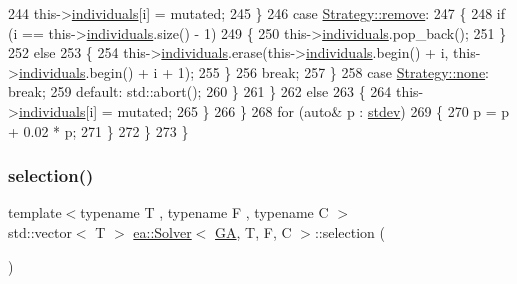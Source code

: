 \begin{DoxyCode}
244                         this->\hyperlink{classea_1_1_solver__base_ad75bc440d24a46e97694c7c889f2ecde}{individuals}[i] = mutated;
245                     \}
246                     \textcolor{keywordflow}{case} \hyperlink{namespaceea_a8e369877773b4db67b8512efdb4f8f89a0f6969d7052da9261e31ddb6e88c136e}{Strategy::remove}:
247                     \{
248                         \textcolor{keywordflow}{if} (i == this->\hyperlink{classea_1_1_solver__base_ad75bc440d24a46e97694c7c889f2ecde}{individuals}.size() - 1)
249                         \{
250                             this->\hyperlink{classea_1_1_solver__base_ad75bc440d24a46e97694c7c889f2ecde}{individuals}.pop\_back();
251                         \}
252                         \textcolor{keywordflow}{else}
253                         \{
254                             this->\hyperlink{classea_1_1_solver__base_ad75bc440d24a46e97694c7c889f2ecde}{individuals}.erase(this->\hyperlink{classea_1_1_solver__base_ad75bc440d24a46e97694c7c889f2ecde}{individuals}.begin() + i, 
      this->\hyperlink{classea_1_1_solver__base_ad75bc440d24a46e97694c7c889f2ecde}{individuals}.begin() + i + 1);
255                         \}
256                         \textcolor{keywordflow}{break};
257                     \}
258                     \textcolor{keywordflow}{case} \hyperlink{namespaceea_a8e369877773b4db67b8512efdb4f8f89a334c4a4c42fdb79d7ebc3e73b517e6f8}{Strategy::none}: \textcolor{keywordflow}{break};
259                     \textcolor{keywordflow}{default}: std::abort();
260                     \}
261                 \}
262                 \textcolor{keywordflow}{else}
263                 \{
264                     this->\hyperlink{classea_1_1_solver__base_ad75bc440d24a46e97694c7c889f2ecde}{individuals}[i] = mutated;
265                 \}
266             \}
268             \textcolor{keywordflow}{for} (\textcolor{keyword}{auto}& p : \hyperlink{classea_1_1_solver_3_01_g_a_00_01_t_00_01_f_00_01_c_01_4_a097a7ec4bbcf9e5bade6e498d55d4d11}{stdev})
269             \{
270                 p = p + 0.02 * p;
271             \}
272         \}
273     \}
\end{DoxyCode}
\mbox{\label{classea_1_1_solver_3_01_g_a_00_01_t_00_01_f_00_01_c_01_4_a1bc73c28211d7ba80665b286fbdea948}} 
\subsubsection{\texorpdfstring{selection()}{selection()}}
{\footnotesize\ttfamily template$<$typename T , typename F , typename C $>$ \\
std\+::vector$<$ T $>$ \hyperlink{classea_1_1_solver}{ea\+::\+Solver}$<$ \hyperlink{structea_1_1_g_a}{GA}, T, F, C $>$\+::selection (\begin{DoxyParamCaption}{ }\end{DoxyParamCaption})\hspace{0.3cm}{\ttfamily [private]}}



